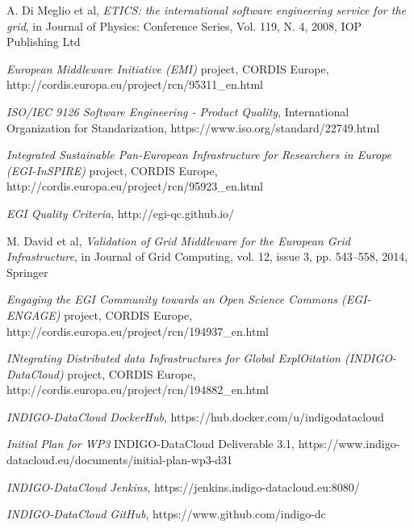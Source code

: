 \documentclass[journal]{IEEEtran}
\begin{document}
\begin{thebibliography}{1}
A. Di Meglio et al, \emph{ETICS: the international software engineering service for the grid}, in Journal of Physics: Conference Series, Vol. 119, N. 4, 2008, IOP Publishing Ltd

\emph{European Middleware Initiative (EMI)} project, CORDIS Europe, http://cordis.europa.eu/project/rcn/95311\_en.html

\emph{ISO/IEC 9126 Software Engineering - Product Quality}, International Organization for Standarization, https://www.iso.org/standard/22749.html

\emph{Integrated Sustainable Pan-European Infrastructure for Researchers in Europe (EGI-InSPIRE)} project, CORDIS Europe, http://cordis.europa.eu/project/rcn/95923\_en.html

\emph{EGI Quality Criteria}, http://egi-qc.github.io/

M. David et al, \emph{Validation of Grid Middleware for the European Grid Infrastructure}, in Journal of Grid Computing, vol. 12, issue 3, pp. 543–558, 2014, Springer

\emph{Engaging the EGI Community towards an Open Science Commons (EGI-ENGAGE)} project, CORDIS Europe, http://cordis.europa.eu/project/rcn/194937\_en.html

\emph{INtegrating Distributed data Infrastructures for Global ExplOitation (INDIGO-DataCloud)} project, CORDIS Europe, http://cordis.europa.eu/project/rcn/194882\_en.html

\emph{INDIGO-DataCloud DockerHub}, https://hub.docker.com/u/indigodatacloud

\emph{Initial Plan for WP3} INDIGO-DataCloud Deliverable 3.1, https://www.indigo-datacloud.eu/documents/initial-plan-wp3-d31

\emph{INDIGO-DataCloud Jenkins}, https://jenkins.indigo-datacloud.eu:8080/

\emph{INDIGO-DataCloud GitHub}, https://www.github.com/indigo-dc

\end{thebibliography}



\end{document}
